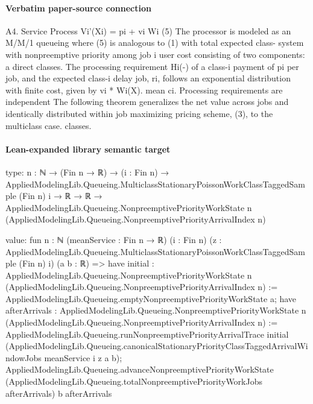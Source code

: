 \documentclass[10pt]{article}
\begin{document}
\paragraph{Verbatim paper-source connection}
\begin{ReviewVerbatim}
A4. Service Process                                                      Vi'(Xi) = pi + vi Wi (5)
The processor is modeled as an M/M/1 queueing                          where (5) is analogous to (1) with total expected class-
system with nonpreemptive priority among job                           i user cost consisting of two components: a direct
classes. The processing requirement Hi(-) of a class-i                 payment of pi per job, and the expected class-i delay
job, ri, follows an exponential distribution with finite cost, given by vi * Wi(X).
mean ci. Processing requirements are independent           The following theorem generalizes the net value
across jobs and identically distributed within job       maximizing pricing scheme, (3), to the multiclass case.
classes.
\end{ReviewVerbatim}



\paragraph{Lean-expanded library semantic target}
\begin{ReviewVerbatim}
type:
{n : ℕ} →
  (Fin n → ℝ) →
    (i : Fin n) →
      AppliedModelingLib.Queueing.MulticlassStationaryPoissonWorkClassTaggedSample (Fin n) i →
        ℝ →
          ℝ →
            AppliedModelingLib.Queueing.NonpreemptivePriorityWorkState n
              (AppliedModelingLib.Queueing.NonpreemptivePriorityArrivalIndex n)

value:
fun {n : ℕ} (meanService : Fin n → ℝ) (i : Fin n)
    (z : AppliedModelingLib.Queueing.MulticlassStationaryPoissonWorkClassTaggedSample (Fin n) i) (a b : ℝ) =>
  have initial :
    AppliedModelingLib.Queueing.NonpreemptivePriorityWorkState n
      (AppliedModelingLib.Queueing.NonpreemptivePriorityArrivalIndex n) :=
    AppliedModelingLib.Queueing.emptyNonpreemptivePriorityWorkState a;
  have afterArrivals :
    AppliedModelingLib.Queueing.NonpreemptivePriorityWorkState n
      (AppliedModelingLib.Queueing.NonpreemptivePriorityArrivalIndex n) :=
    AppliedModelingLib.Queueing.runNonpreemptivePriorityArrivalTrace initial
      (AppliedModelingLib.Queueing.canonicalStationaryPriorityClassTaggedArrivalWindowJobs meanService i z a b);
  AppliedModelingLib.Queueing.advanceNonpreemptivePriorityWorkState
    (AppliedModelingLib.Queueing.totalNonpreemptivePriorityWorkJobs afterArrivals) b afterArrivals
\end{ReviewVerbatim}
\end{document}
